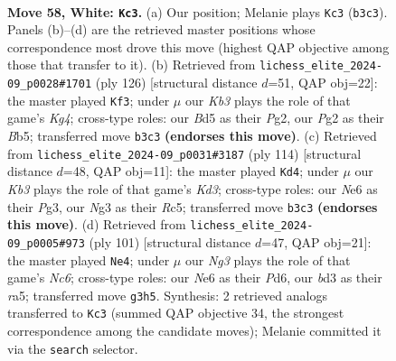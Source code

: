 \documentclass[11pt]{article}
\begin{document}
\clearpage

\begin{figure}[p]\centering
\begin{subfigure}{0.46\textwidth}\centering
\resizebox{\linewidth}{!}{%
\newchessgame
\chessboard[
  setfen={8/k4r2/4N3/2RB1p2/1P6/1K1b2N1/6P1/8 w - - 12 58},
  showmover=false,
  pgfstyle=straightmove, color=movearrow, markmove={b3-c3}
]}
\caption{}
\end{subfigure}\hfill
\begin{subfigure}{0.46\textwidth}\centering
\resizebox{\linewidth}{!}{%
\newchessgame
\chessboard[
  setfen={8/2b4p/5kp1/pB6/P1N3K1/8/6P1/8 w - - 3 64},
  showmover=false,
  pgfstyle=straightmove, color=movearrow, markmove={g4-f3}
]}
\caption{}
\end{subfigure}
\\[4pt]
\begin{subfigure}{0.46\textwidth}\centering
\resizebox{\linewidth}{!}{%
\newchessgame
\chessboard[
  setfen={8/8/r4k2/2R4p/2P2Bb1/3K2P1/8/8 w - - 5 58},
  showmover=false,
  pgfstyle=straightmove, color=movearrow, markmove={d3-d4}
]}
\caption{}
\end{subfigure}\hfill
\begin{subfigure}{0.46\textwidth}\centering
\resizebox{\linewidth}{!}{%
\newchessgame
\chessboard[
  setfen={8/1k6/3p4/R2Pb3/6K1/2n5/8/6B1 b - - 2 51},
  showmover=false,
  pgfstyle=straightmove, color=movearrow, markmove={c3-e4}
]}
\caption{}
\end{subfigure}
\caption{\textbf{Move 58, White: \texttt{Kc3}.} (a) Our position; Melanie plays \texttt{Kc3} (\texttt{b3c3}). Panels (b)--(d) are the retrieved master positions whose correspondence most drove this move (highest QAP objective among those that transfer to it). (b) Retrieved from \texttt{lichess\_elite\_2024-09\_p0028\#1701} (ply 126) [structural distance $d$=51, QAP obj=22]: the master played \texttt{Kf3}; under $\mu$ our \emph{Kb3} plays the role of that game's \emph{Kg4}; cross-type roles: our \emph{B}d5 as their \emph{P}g2, our \emph{P}g2 as their \emph{B}b5; transferred move \texttt{b3c3} \textbf{(endorses this move)}. (c) Retrieved from \texttt{lichess\_elite\_2024-09\_p0031\#3187} (ply 114) [structural distance $d$=48, QAP obj=11]: the master played \texttt{Kd4}; under $\mu$ our \emph{Kb3} plays the role of that game's \emph{Kd3}; cross-type roles: our \emph{N}e6 as their \emph{P}g3, our \emph{N}g3 as their \emph{R}c5; transferred move \texttt{b3c3} \textbf{(endorses this move)}. (d) Retrieved from \texttt{lichess\_elite\_2024-09\_p0005\#973} (ply 101) [structural distance $d$=47, QAP obj=21]: the master played \texttt{Ne4}; under $\mu$ our \emph{Ng3} plays the role of that game's \emph{Nc6}; cross-type roles: our \emph{N}e6 as their \emph{P}d6, our \emph{b}d3 as their \emph{r}a5; transferred move \texttt{g3h5}. Synthesis: 2 retrieved analogs transferred to \texttt{Kc3} (summed QAP objective 34, the strongest correspondence among the candidate moves); Melanie committed it via the \texttt{search} selector.}
\label{fig:thought-m114}
\end{figure}
\end{document}
